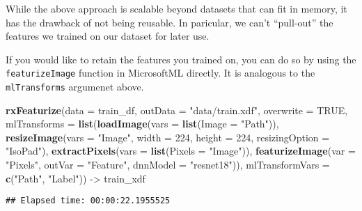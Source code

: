 \documentclass[]{book}
\newenvironment{Shaded}{\begin{snugshade}}{\end{snugshade}}
\newcommand{\KeywordTok}[1]{\textcolor[rgb]{0.13,0.29,0.53}{\textbf{#1}}}
\newcommand{\DataTypeTok}[1]{\textcolor[rgb]{0.13,0.29,0.53}{#1}}
\newcommand{\DecValTok}[1]{\textcolor[rgb]{0.00,0.00,0.81}{#1}}
\newcommand{\StringTok}[1]{\textcolor[rgb]{0.31,0.60,0.02}{#1}}
\newcommand{\OtherTok}[1]{\textcolor[rgb]{0.56,0.35,0.01}{#1}}
\newcommand{\NormalTok}[1]{#1}
\theoremstyle{definition}
\theoremstyle{definition}
\theoremstyle{definition}
\theoremstyle{remark}
\begin{document}
While the above approach is scalable beyond datasets that can fit in
memory, it has the drawback of not being reusable. In paricular, we
can't ``pull-out'' the features we trained on our dataset for later use.

If you would like to retain the features you trained on, you can do so
by using the \texttt{featurizeImage} function in MicrosoftML directly.
It is analogous to the \texttt{mlTransforms} argumenet above.

\begin{Shaded}
\begin{Highlighting}[]
\KeywordTok{rxFeaturize}\NormalTok{(}\DataTypeTok{data =}\NormalTok{ train_df, }
            \DataTypeTok{outData =} \StringTok{"data/train.xdf"}\NormalTok{, }
            \DataTypeTok{overwrite =} \OtherTok{TRUE}\NormalTok{,}
            \DataTypeTok{mlTransforms =} \KeywordTok{list}\NormalTok{(}\KeywordTok{loadImage}\NormalTok{(}\DataTypeTok{vars =} \KeywordTok{list}\NormalTok{(}\DataTypeTok{Image =} \StringTok{"Path"}\NormalTok{)),}
                                \KeywordTok{resizeImage}\NormalTok{(}\DataTypeTok{vars =} \StringTok{"Image"}\NormalTok{, }
                                            \DataTypeTok{width =} \DecValTok{224}\NormalTok{, }\DataTypeTok{height =} \DecValTok{224}\NormalTok{, }
                                            \DataTypeTok{resizingOption =} \StringTok{"IsoPad"}\NormalTok{),}
                                \KeywordTok{extractPixels}\NormalTok{(}\DataTypeTok{vars =} \KeywordTok{list}\NormalTok{(}\DataTypeTok{Pixels =} \StringTok{"Image"}\NormalTok{)),}
                                \KeywordTok{featurizeImage}\NormalTok{(}\DataTypeTok{var =} \StringTok{"Pixels"}\NormalTok{, }
                                               \DataTypeTok{outVar =} \StringTok{"Feature"}\NormalTok{, }
                                               \DataTypeTok{dnnModel =} \StringTok{"resnet18"}\NormalTok{)),}
            \DataTypeTok{mlTransformVars =} \KeywordTok{c}\NormalTok{(}\StringTok{"Path"}\NormalTok{, }\StringTok{"Label"}\NormalTok{)) ->}\StringTok{ }\NormalTok{train_xdf}
\end{Highlighting}
\end{Shaded}

\begin{verbatim}
## Elapsed time: 00:00:22.1955525
\end{verbatim}
\end{document}
